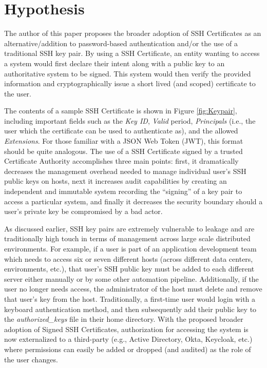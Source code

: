 \documentclass[conference]{IEEEtran}
\begin{document}
\section{Hypothesis}
The author of this paper proposes the broader adoption of SSH Certificates as an alternative/addition to password-based authentication and/or the use of a traditional SSH key pair. By using a SSH Certificate, an entity wanting to access a system would first declare their intent along with a public key to an authoritative system to be signed. This system would then verify the provided information and cryptographically issue a short lived (and scoped) certificate to the user.

The contents of a sample SSH Certificate is shown in Figure \ref{fig:Keypair}, including important fields such as the \textit{Key ID}, \textit{Valid} period, \textit{Principals} (i.e., the user which the certificate can be used to authenticate as), and the allowed \textit{Extensions}. For those familiar with a JSON Web Token (JWT), this format should be quite analogous. The use of a SSH Certificate signed by a trusted Certificate Authority accomplishes three main points: first, it dramatically decreases the management overhead needed to manage individual user’s SSH public keys on hosts, next it increases audit capabilities by creating an independent and immutable system recording the “signing” of a key pair to access a particular system, and finally it decreases the security boundary should a user’s private key be compromised by a bad actor.

As discussed earlier, SSH key pairs are extremely vulnerable to leakage and are traditionally high touch in terms of management across large scale distributed environments. For example, if a user is part of an application development team which needs to access six or seven different hosts (across different data centers, environments, etc.), that user’s SSH public key must be added to each different server either manually or by some other automation pipeline. Additionally, if the user no longer needs access, the administrator of the host must delete and remove that user’s key from the host. Traditionally, a first-time user would login with a keyboard authentication method, and then subsequently add their public key to the \textit{authorized{\_}keys} file in their home directory. With the proposed broader adoption of Signed SSH Certificates, authorization for accessing the system is now externalized to a third-party (e.g., Active Directory, Okta, Keycloak, etc.) where permissions can easily be added or dropped (and audited) as the role of the user changes.
\end{document}
